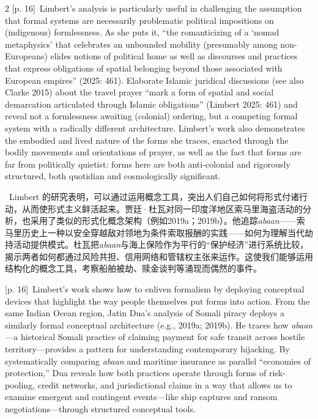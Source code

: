 \documentclass[10pt,a4paper]{article}
\begin{document}
\begin{paracol}{2}
{\scriptsize\color{gray} [p. 16]}\ Limbert’s analysis is particularly useful in challenging the assumption that formal systems are necessarily problematic political impositions on (indigenous) formlessness. As she puts it, “the romanticizing of a ‘nomad metaphysics’ that celebrates an unbounded mobility (presumably among non-Europeans) elides notions of political home as well as discourses and practices that express obligations of spatial belonging beyond those associated with European empires” (2025: 461). Elaborate Islamic juridical discussions (see also Clarke 2015) about the travel prayer “mark a form of spatial and social demarcation articulated through Islamic obligations” (Limbert 2025: 461) and reveal not a formlessness awaiting (colonial) ordering, but a competing formal system with a radically different architecture. Limbert’s work also demonstrates the embodied and lived nature of the forms she traces, enacted through the bodily movements and orientations of prayer, as well as the fact that forms are far from politically quietist: forms here are both anti-colonial and rigorously structured, both quotidian and cosmologically significant.\par
\switchcolumn*
{\scriptsize\color{gray} [p. 16]}\ Limbert 的研究表明，可以通过运用概念工具，突出人们自己如何将形式付诸行动，从而使形式主义鲜活起来。贾廷·杜瓦对同一印度洋地区索马里海盗活动的分析，也采用了类似的形式化概念架构（例如2019a；2019b）。他追踪\textit{abaan}——索马里历史上一种以安全穿越敌对领地为条件索取报酬的实践——如何为理解当代劫持活动提供模式。杜瓦把\textit{abaan}与海上保险作为平行的“保护经济”进行系统比较，揭示两者如何都通过风险共担、信用网络和管辖权主张来运作。这使我们能够运用结构化的概念工具，考察船舶被劫、赎金谈判等涌现而偶然的事件。\par
\switchcolumn
{\scriptsize\color{gray} [p. 16]}\ Limbert’s work shows how to enliven formalism by deploying conceptual devices that highlight the way people themselves put forms into action. From the same Indian Ocean region, Jatin Dua’s analysis of Somali piracy deploys a similarly formal conceptual architecture (e.g., 2019a; 2019b). He traces how \textit{abaan} \textit{—}a historical Somali practice of claiming payment for safe transit across hostile territory—provides a pattern for understanding contemporary hijacking. By systematically comparing \textit{abaan} and maritime insurance as parallel “economies of protection,” Dua reveals how both practices operate through forms of risk-pooling, credit networks, and jurisdictional claims in a way that allows us to examine emergent and contingent events—like ship captures and ransom negotiations—through structured conceptual tools.\par

\end{paracol}
\end{document}
